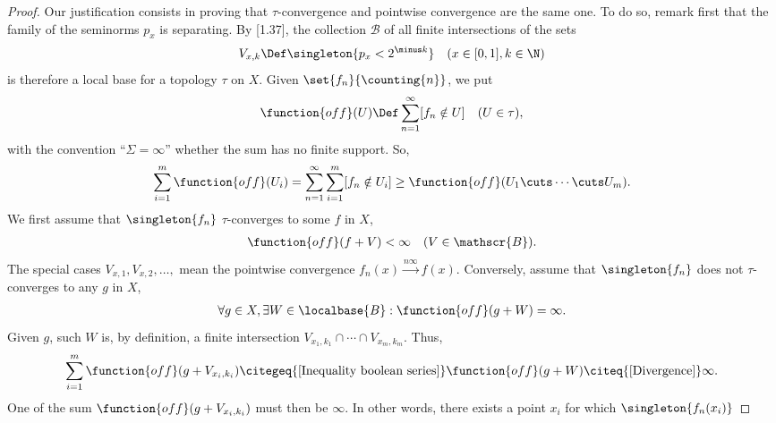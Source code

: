\begin{proof}
Our justification consists in proving that $\tau$-convergence and pointwise 
convergence are the same one. 
%
To do so, remark first that the family of the seminorms $p_{x}$ is separating.
By [1.37], the collection $\mathscr{B}$ of all finite intersections 
of the sets 
%
  \begin{align}
    V_{x, k} 
      \Def 
    \singleton{p_x < 2^{\minus k}} 
      \quad 
    (x \in [0, 1], k \in \N)
  \end{align}
%
is therefore a local base for a topology $\tau$ on $X$. Given 
%
  $\set{f_n}{\counting{n}}$, 
%
we put
%
\newcommand\off[1]{\function{off}(#1)}
%
\begin{align}
  \off{U} \Def \sum_{n=1}^\infty [f_n \notin U] \quad (U\in\tau),
\end{align}
%
with the convention %
%
  ``$\Sigma=\infty$'' %
%
whether the sum has no finite support. 
So, 
%
  \begin{align}
    \label{Inequality boolean series}
    \sum_{i=1}^m \off{U_{i}} 
      = 
    \sum_{n=1}^\infty \sum_{i=1}^m [f_n \notin U_{i}]
      \geq 
    \off{U_{1} \cuts \cdots \cuts U_{m}}.
  \end{align}
%
We first assume that $\singleton{f_n}$ $\tau$-converges to some $f$ in $X$, \ie
%
  \begin{align}
    \off{f+V} < \infty \quad(V \in \mathscr{B}).
  \end{align}
%
The special cases %
%
  $V_{x, 1}, V_{x, 2}, \dots, $ %
%
mean the pointwise convergence %
%
  $f_n(x) \overset{n\infty}{\longrightarrow} f(x)$. %
%
Conversely, assume that $\singleton{f_n}$ does not $\tau$-converges to any $g$ 
in $X$, \ie 
%
  \begin{align}
    \label{Divergence}
    \forall g \in X, \exists W \in \localbase{B}: 
      \off{g+W} = \infty. 
  \end{align}
%
Given $g$, such $W$ is, by definition,  a finite intersection
%
  $
    V_{x_{1}, k_{1}} \cap \cdots \cap 
    V_{x_{m}, k_{m}} 
  $.
%
Thus,
%
  \begin{align}
    \sum_{i=1}^m \off{g + V_{x_{i}, k_{i}}} 
        \citegeq{\ref{Inequality boolean series}} 
    \off{g + W} 
      \citeq{\ref{Divergence}} 
    \infty .
  \end{align}
%
One of the sum $\off{g + V_{x_{i}, k_{i}}}$ must then be $\infty$. 
In other words, there exists a point $x_i$ for which $\singleton{f_n(x_i)}$ %

\end{proof}
